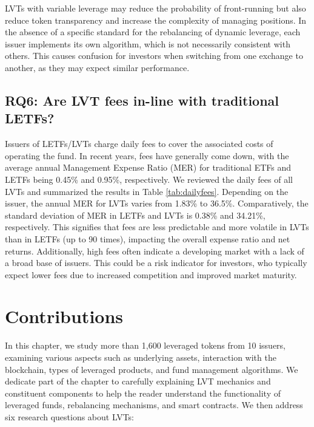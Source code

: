 LVTs with variable leverage may reduce the probability of front-running but also reduce token transparency and increase the complexity of managing positions. In the absence of a specific standard for the rebalancing of dynamic leverage, each issuer implements its own algorithm, which is not necessarily consistent with others. This causes confusion for investors when switching from one exchange to another, as they may expect similar performance.


\subsection{RQ6: Are LVT fees in-line with traditional LETFs?}\label{subsec:fees}
Issuers of LETFs/LVTs charge daily fees to cover the associated costs of operating the fund. In recent years, fees have generally come down, with the average annual Management Expense Ratio (MER) for traditional ETFs and LETFs being 0.45\% and 0.95\%, respectively. We reviewed the daily fees of all LVTs and summarized the results in Table \ref{tab:dailyfees}. Depending on the issuer, the annual MER for LVTs varies from 1.83\% to 36.5\%. Comparatively, the standard deviation of MER in LETFs and LVTs is 0.38\% and 34.21\%, respectively. This signifies that fees are less predictable and more volatile in LVTs than in LETFs (up to 90 times), impacting the overall expense ratio and net returns. Additionally, high fees often indicate a developing market with a lack of a broad base of issuers. This could be a risk indicator for investors, who typically expect lower fees due to increased competition and improved market maturity.


\section{Contributions}
In this chapter, we study more than 1,600 leveraged tokens from 10 issuers, examining various aspects such as underlying assets, interaction with the blockchain, types of leveraged products, and fund management algorithms. We dedicate part of the chapter to carefully explaining LVT mechanics and constituent components to help the reader understand the functionality of leveraged funds, rebalancing mechanisms, and smart contracts. We then address six research questions about LVTs:

